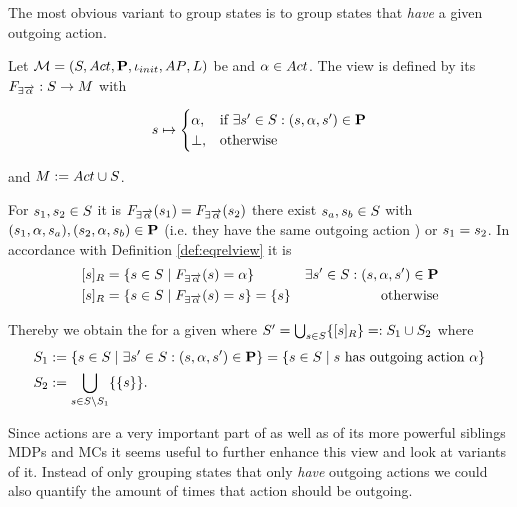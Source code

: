 \documentclass[preview]{standalone}
\begin{document}
The most obvious variant to group states is to group states that \emph{have} a given outgoing action. 

\begin{definition}
	Let ${{{\mathcal{M}}}} = {{({S}, {Act}, {\textbf{P}}, {\iota_{init}}, {AP}, {L})}}$ be \chosengraphtypeN and ${\alpha} \in {Act}$. The view \viewhasoutaction is defined by its \grpfctN ${{F_{\exists{\overrightarrow{\ensuremath{{\alpha}}}}}}} : {S} \to {\ensuremath{{M}}}$ with 
	
	\[
	{s} \mapsto
	\begin{cases}
		{\alpha},				& \text{if } \exists {s}' \in {S}: ({s}, {\alpha}, {s}') \in {\ensuremath{{\textbf{P}}}} \\
		{\bot},          	& \text{otherwise}
	\end{cases}
	\]
	
	and ${{M}} := {{Act} \cup {S}}$.	
\end{definition}


For ${s}_1,{s}_2 \in {S}$ it is ${{F_{\exists{\overrightarrow{\ensuremath{{\alpha}}}}}}}({s}_1) = {{F_{\exists{\overrightarrow{\ensuremath{{\alpha}}}}}}}({s}_2)$ \iffN 
there exist ${s}_{a},{s}_{b} \in {S}$ with 
$({s}_1, {\alpha}, {s}_{a}), ({s}_2, {\alpha}, {s}_{b}) \in {\ensuremath{{\textbf{P}}}}$ (i.e. they have the same outgoing action \action) or ${s}_1 = {s}_2$. 
In accordance with Definition \ref{def:eqrelview} it is
\begin{align*}
	{\ensuremath{{[{s}]_{{R}}}}} &= \{{s} \in {S} \mid {\ensuremath{{F_{\exists{\overrightarrow{\ensuremath{{\alpha}}}}}}}}({s}) = {\alpha}\} &\exists{s}' \in {S} : ({s}, {\alpha}, {s}') \in {\ensuremath{{\textbf{P}}}} \\
	{{[{s}]_{{R}}}} &= \{{s} \in {S} \mid {\ensuremath{{F_{\exists{\overrightarrow{\ensuremath{{\alpha}}}}}}}}({s}) = {s}\} = \{s\} &\text{ otherwise}
\end{align*}

Thereby we obtain the \viewN \viewhasoutaction for a given \chosengraphtypeN \chgph where ${S}' = \bigcup_{{s} \in {S}} \{{{[{s}]_{{R}}}}\} =: {S}_1 \cup {S}_2$ where
\begin{align*}
	 {S}_1 &:= \{{s} \in {S} \mid \exists {s}' \in {S}: ({s}, {\alpha}, {s}') \in {\ensuremath{{\textbf{P}}}}\} = \{{s} \in {S} \mid {s} \text{ has outgoing action \ensuremath{{\alpha}}}\} \\
	{S}_2 &:= {\bigcup_{{s} \in {S} \setminus {S}_1}\{\{{s}\}\}}.
\end{align*}


Since actions are a very important part of \chosengraphtypesN as well as of its more powerful siblings MDPs and MCs it seems useful to further enhance this view and look at variants of it. Instead of only grouping states that only \emph{have} outgoing actions we could also quantify the amount of times that action should be outgoing.
\end{document}
